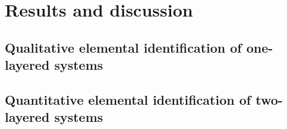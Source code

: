 


\chapter{Results and discussion} %

\label{Chapter4}



\section{Qualitative elemental identification of one-layered systems}


\section{Quantitative elemental identification of two-layered systems}




